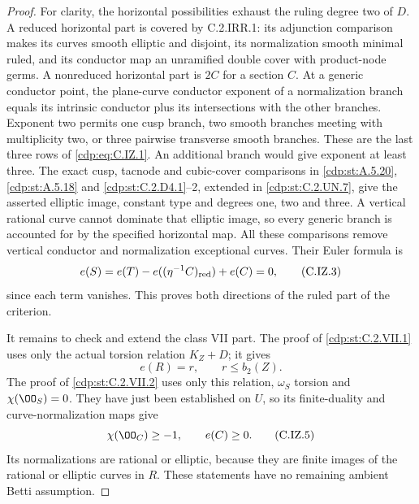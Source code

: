\begin{proof}
For clarity, the horizontal possibilities exhaust the
ruling degree two of $D$. A reduced horizontal part is
covered by C.2.IRR.1: its adjunction comparison makes its
curves smooth elliptic and disjoint, its normalization
smooth minimal ruled, and its conductor map an unramified
double cover with product-node germs. A nonreduced
horizontal part is $2C$ for a section $C$. At a generic
conductor point, the plane-curve conductor exponent of a
normalization branch equals its intrinsic conductor plus
its intersections with the other branches. Exponent two
permits one cusp branch, two smooth branches meeting with
multiplicity two, or three pairwise transverse smooth
branches. These are the last three rows of \eqref{cdp:eq:C.IZ.1}.
An additional branch would give exponent at least three.
The exact cusp, tacnode and cubic-cover comparisons in
\ref{cdp:st:A.5.20}, \ref{cdp:st:A.5.18} and \ref{cdp:st:C.2.D4.1}--2, extended in \ref{cdp:st:C.2.UN.7},
give the asserted elliptic image, constant type and
degrees one, two and three. A vertical rational curve
cannot dominate that elliptic image, so every generic
branch is accounted for by the specified horizontal map.
All these comparisons remove vertical conductor and
normalization exceptional curves. Their Euler formula is
\[
 e(S)=e(T)-e((\eta^{-1}C)_{\rm red})+e(C)=0,             \tag{C.IZ.3}\label{cdp:eq:C.IZ.3}
\]
since each term vanishes. This proves both directions of
the ruled part of the criterion.

It remains to check and extend the class VII part. The
proof of \ref{cdp:st:C.2.VII.1} uses only the actual torsion relation
$K_Z+D$; it gives
\[
 e(R)=r,\qquad r\le b_2(Z).                              \tag{C.IZ.4}\label{cdp:eq:C.IZ.4}
\]
The proof of \ref{cdp:st:C.2.VII.2} uses only this relation,
$\omega_S$ torsion and $\chi(\OO_S)=0$. They have just
been established on $U$, so its finite-duality and
curve-normalization maps give
\[
 \chi(\OO_C)\ge-1,\qquad e(C)\ge0.                      \tag{C.IZ.5}\label{cdp:eq:C.IZ.5}
\]
Its normalizations are rational or elliptic, because they
are finite images of the rational or elliptic curves in
$R$. These statements have no remaining ambient Betti
assumption.


\end{proof}
